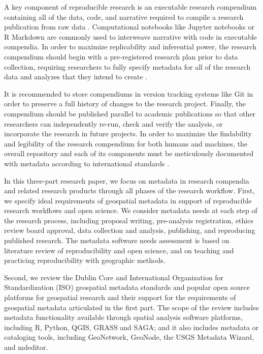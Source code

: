 \documentclass{isprs} %
\begin{document}
A key component of reproducible research is an executable research compendium containing all of the data, code, and narrative required to compile a research publication from raw data \cite{Nust2021}.
Computational notebooks like Jupyter notebooks or R Markdown are commonly used to interweave narrative with code in executable compendia.
In order to maximize replicability and inferential power, the research compendium should begin with a pre-registered research plan prior to data collection, requiring researchers to fully specify metadata for all of the research data and analyzes that they intend to create \cite{Nosek2018}.

It is recommended to store compendiums in version tracking systems like Git in order to preserve a full history of changes to the research project.
Finally, the compendium should be published parallel to academic publications so that other researchers can independently re-run, check and verify the analysis, or incorporate the research in future projects.
In order to maximize the findability and legibility of the research compendium for both humans and machines, the overall repository and each of its components must be meticulously documented with metadata according to international standards \cite{Wilkinson2016,Wilson2021}.

In this three-part research paper, we focus on metadata in research compendia and related research products through all phases of the research workflow.
First, we specify ideal requirements of geospatial metadata in support of reproducible research workflows and open science.
We consider metadata needs at each step of the research process, including proposal writing, pre-analysis registration, ethics review board approval, data collection and analysis, publishing, and reproducing published research.
The metadata software needs assessment is based on literature review of reproducibility and open science, and on teaching and practicing reproducibility with geographic methods.

Second, we review the Dublin Core and International Organization for Standardization (ISO) geospatial metadata standards and popular open source platforms for geospatial research and their support for the requirements of geospatial metadata articulated in the first part.
The scope of the review includes metadata functionality available through spatial analysis software platforms, including R, Python, QGIS, GRASS and SAGA; and it also includes metadata or cataloging tools, including GeoNetwork, GeoNode, the USGS Metadata Wizard, and mdeditor.
\end{document}
